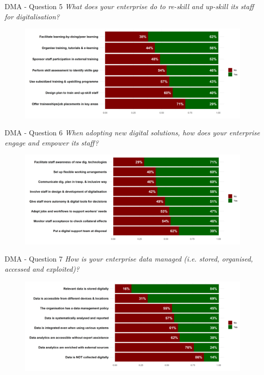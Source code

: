 \documentclass{beamer}
\begin{document}
    \begin{frame}{DMA - Question 5}
        \centering\textit{What does your enterprise do to re-skill and up-skill its staff for digitalisation?}
        \begin{figure}
            \centering
            \includegraphics[width=\textwidth]{../Output/q5.png}

        \end{figure}
    \end{frame}

    \begin{frame}{DMA - Question 6}
        \centering\textit{When adopting new digital solutions, how does your enterprise engage and empower its staff?}
        \begin{figure}
            \centering
            \includegraphics[width=\textwidth]{../Output/q6.png}

        \end{figure}
    \end{frame}

    \begin{frame}{DMA - Question 7}
        \centering\textit{How is your enterprise data managed (i.e. stored, organised, accessed and exploited)?}
        \begin{figure}
            \centering
            \includegraphics[width=\textwidth]{../Output/q7.png}

        \end{figure}
    \end{frame}
\end{document}
